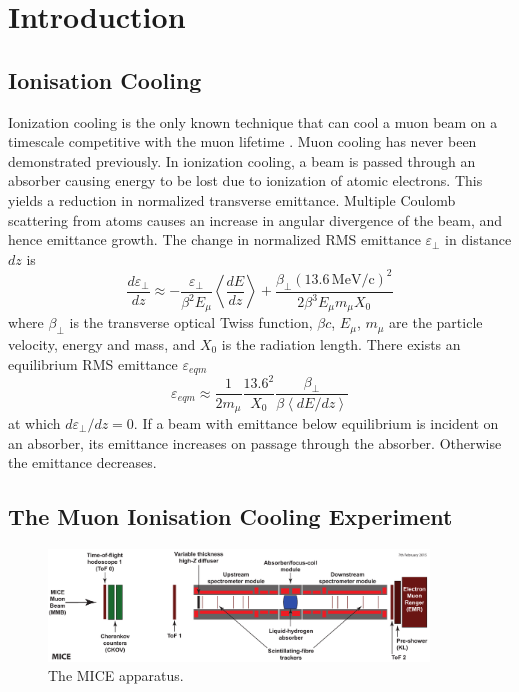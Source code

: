 \section{Introduction}
\label{Sect:Intro}

\subsection{Ionisation Cooling}

Ionization cooling \cite{ionization_cooling} is the only known technique that 
can cool a muon beam on a timescale competitive with the muon lifetime 
\cite{neutrino_factory} \cite{neutrino_factory_2} \cite{muon_collider} 
\cite{muon_collider_2}. Muon cooling has never been demonstrated previously. In 
ionization cooling, a beam is passed through an absorber causing energy to be 
lost due to ionization of atomic electrons. This yields a reduction in 
normalized transverse emittance. Multiple Coulomb scattering from atoms causes 
an increase in angular divergence of the beam, and hence emittance growth. The 
change in normalized RMS emittance $\varepsilon_\perp$ in distance $dz$ is 
\cite{ionization_cooling}
\begin{equation}
\frac{d\varepsilon_{\perp}}{dz} \approx 
    - \frac{\varepsilon_\perp}{\beta^2 E_\mu} \left<\frac{dE}{dz}\right> 
    + \frac{\beta_\perp (13.6\,\mathrm{MeV/c})^2}{2 \beta^3 E_\mu m_\mu X_0}
\end{equation}
where $\beta_\perp$ is the transverse optical Twiss function, $\beta c$, 
$E_\mu$, $m_\mu$ are the particle velocity, energy and mass, and $X_0$ is the 
radiation length. There exists an equilibrium RMS emittance $\varepsilon_{eqm}$
\begin{equation}
\varepsilon_{eqm} \approx \frac{1}{2m_\mu} \frac{13.6^2}{X_0} \frac{\beta_\perp}{\beta \left<dE/dz\right>}
\label{eq:eqm_emittance}
\end{equation}
at which $d\varepsilon_{\perp}/dz = 0$. If a beam with emittance below 
equilibrium is incident on an absorber, its emittance increases on passage 
through the absorber. Otherwise the emittance decreases.

\subsection{The Muon Ionisation Cooling Experiment}

\begin{figure}[!tbh]
    \includegraphics*[width=0.9\textwidth]{01-Introduction/Figures/Step-4-labels.pdf}
    \caption{The MICE apparatus. \label{fig:Step4}}
\end{figure}

